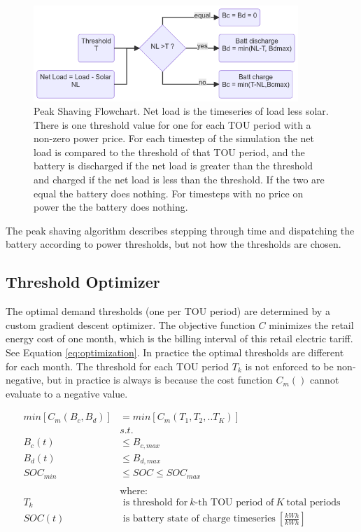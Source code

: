 \documentclass[
]{article}
\begin{document}
\begin{figure}
  \centering
  \includegraphics[width=10cm,height=\textheight]{./images/peak shaving flowchart.png}
  \caption{Peak Shaving Flowchart. Net load is the
  timeseries of load less solar. There is one threshold value for one for
  each TOU period with a non-zero power price. For each timestep of the
  simulation the net load is compared to the threshold of that TOU period,
  and the battery is discharged if the net load is greater than the
  threshold and charged if the net load is less than the threshold. If the
  two are equal the battery does nothing. For timesteps with no price on
  power the the battery does nothing.}
  \label{fig:peakshaving-flowchart}
\end{figure}

The peak shaving algorithm describes stepping through time and
dispatching the battery according to power thresholds, but not how the
thresholds are chosen.

\hypertarget{threshold-optimizer}{%
  \subsection{Threshold Optimizer}\label{threshold-optimizer}}

The optimal demand thresholds (one per TOU period) are determined by a
custom gradient descent optimizer. The objective function \(C\)
minimizes the retail energy cost of one month, which is the billing
interval of this retail electric tariff. See Equation \ref{eq:optimization}. In practice the optimal
thresholds are different for each month. The threshold for each TOU
period \(T_k\) is not enforced to be non-negative, but in practice is
always is because the cost function \(C_m()\) cannot evaluate to a
negative value.

\begin{equation}
  \label{eq:optimization}
  \begin{split}
    min[C_m(B_c,B_d)] & = min[C_m(T_1,T_2,..T_K)] \\
    & s.t. \\
    B_c(t) & \le B_{c,max} \\
    B_d(t) & \le B_{d,max} \\
    SOC_{min} & \le SOC \le SOC_{max} \\
    \\
    & \text{where:} \\
    T_k & \text{ is threshold for}\ k\text{-th TOU period of}\ K\ \text{total periods} \\
    SOC(t) & \text{ is battery state of charge timeseries}\ [\frac{kWh}{kWh}] \\
  \end{split}
\end{equation}
\end{document}
